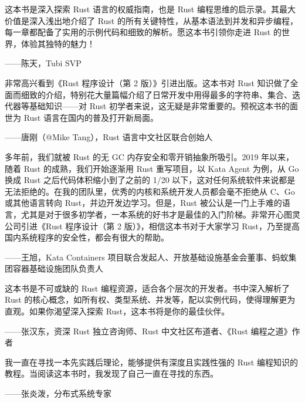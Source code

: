 
这本书是深入探索 Rust 语言的权威指南，也是 Rust 编程思维的启示录。其最大价值是深入浅出地介绍了 Rust 的所有关键特性，从基本语法到并发和异步编程，每一章都配备了实用的示例代码和细致的解析。愿这本书引领你走进 Rust 的世界，体验其独特的魅力！

\begin{myEpigraph}{}
——陈天，Tubi SVP
\end{myEpigraph}

非常高兴看到《Rust 程序设计（第 2 版）》引进出版。这本书对 Rust 知识做了全面而细致的介绍，特别花大量篇幅介绍了日常开发中用得最多的字符串、集合、迭代器等基础知识——对 Rust 初学者来说，这无疑是非常重要的。预祝这本书的面世为 Rust 语言在国内的普及打开新局面。

\begin{myEpigraph}{}
——唐刚（@Mike Tang），Rust 语言中文社区联合创始人
\end{myEpigraph}

多年前，我们就被 Rust 的无 GC 内存安全和零开销抽象所吸引。2019 年以来，随着 Rust 的成熟，我们开始逐渐用 Rust 重写项目，以 Kata Agent 为例，从 Go 换成 Rust 之后代码体积缩小到了之前的 1/20 以下，这对任何系统软件来说都是无法拒绝的。在我的团队里，优秀的内核和系统开发人员都会毫不拒绝从 C、Go 或其他语言转向 Rust，并边开发边学习。但是，Rust 被公认是一门上手难的语言，尤其是对于很多初学者，一本系统的好书才是最佳的入门阶梯。非常开心图灵公司引进《Rust 程序设计（第 2 版）》，相信这本书对于大家学习 Rust，乃至提高国内系统程序的安全性，都会有很大的帮助。

\begin{myEpigraph}{}
——王旭，Kata Containers 项目联合发起人、开放基础设施基金会董事、\newline{}蚂蚁集团容器基础设施团队负责人
\end{myEpigraph}

这本书是不可或缺的 Rust 编程资源，适合各个层次的开发者。书中深入解析了 Rust 的核心概念，如所有权、类型系统、并发等，配以实例代码，使得理解更为直观。如果你渴望深入探索 Rust，这本书将是你的最佳伙伴。

\begin{myEpigraph}{}
——张汉东，资深 Rust 独立咨询师、Rust 中文社区布道者、《Rust 编程之道》作者
\end{myEpigraph}

我一直在寻找一本先实践后理论，能够提供有深度且实践性强的 Rust 编程知识的教程。当阅读这本书时，我发现了自己一直在寻找的东西。

\begin{myEpigraph}{}
——张炎泼，分布式系统专家
\end{myEpigraph}

